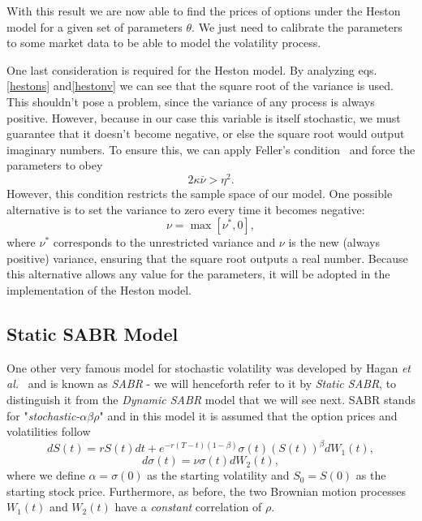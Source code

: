 With this result we are now able to find the prices of options under the Heston model for a given set of parameters $\theta$. We just need to calibrate the parameters to some market data to be able to model the volatility process.


One last consideration is required for the Heston model.
By analyzing eqs.\eqref{hestons} and\eqref{hestonv} we can see that the square root of the variance is used. This shouldn't pose a problem, since the variance of any process is always positive. However, because in our case this variable is itself stochastic, we must guarantee that it doesn't become negative, or else the square root would output imaginary numbers. To ensure this, we can apply Feller's condition~\citep{feller} and force the parameters to obey
\begin{equation}
2\kappa\overline{\nu}>\eta^2.
\end{equation}
\noindent However, this condition restricts the sample space of our model. One possible alternative is to set the variance to zero every time it becomes negative:
\begin{equation}
\nu=\max\left[\nu^*,0\right],
\end{equation}
\noindent where $\nu^*$ corresponds to the unrestricted variance and $\nu$ is the new (always positive) variance, ensuring that the square root outputs a real number. Because this alternative allows any value for the parameters, it will be adopted in the implementation of the Heston model.


\subsection{Static SABR Model}
One other very famous model for stochastic volatility was developed by Hagan \textit{et al.}~\citep{Hagan} and is known as \emph{SABR} - we will henceforth refer to it by \emph{Static SABR}, to distinguish it from the \emph{Dynamic SABR} model that we will see next. SABR stands for "\emph{stochastic-}$\alpha\beta\rho$" and in this model it is assumed that the option prices and volatilities follow~\citep{Geeske}
\begin{equation}\label{dF}
\boxed{dS(t)=rS(t)dt+e^{-r(T-t)(1-\beta)}\sigma(t)(S(t))^\beta dW_1(t),}
\end{equation}
\begin{equation}\label{dsigma}
\boxed{d\sigma(t)=\nu\sigma(t) dW_2(t),}
\end{equation}
\noindent where we define $\alpha=\sigma(0)$ as the starting volatility and $S_0=S(0)$ as the starting stock price. Furthermore, as before, the two Brownian motion processes $W_1(t)$ and $W_2(t)$ have a \emph{constant} correlation of $\rho$.

